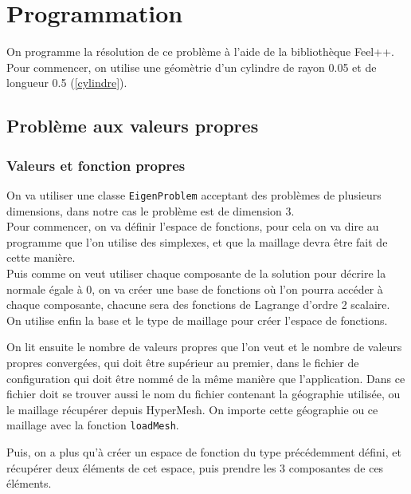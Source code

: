 \chapter{Programmation}

On programme la résolution de ce problème à l'aide de la bibliothèque Feel++. Pour commencer, on utilise une géomètrie d'un cylindre de rayon 0.05 et de longueur 0.5 (\ref{cylindre}).
\section{Problème aux valeurs propres}
\subsection{Valeurs et fonction propres}

On va utiliser une classe \texttt{EigenProblem} acceptant des problèmes de plusieurs dimensions, dans notre cas le problème est de dimension 3.\\
Pour commencer, on va définir l'espace de fonctions, pour cela on va dire au programme que l'on utilise des simplexes, et que la maillage devra être fait de cette manière.\\
Puis comme on veut utiliser chaque composante de la solution pour décrire la normale égale à 0, on va créer une base de fonctions où l'on pourra accéder à chaque composante, chacune sera des fonctions de Lagrange d'ordre 2 scalaire.\\
On utilise enfin la base et le type de maillage pour créer l'espace de fonctions.



On lit ensuite le nombre de valeurs propres que l'on veut et le nombre de valeurs propres convergées, qui doit être supérieur au premier, dans le fichier de configuration qui doit être nommé de la même manière que l'application. Dans ce fichier doit se trouver aussi le nom du fichier contenant la géographie utilisée, ou le maillage récupérer depuis HyperMesh. On importe cette géographie ou ce maillage avec la fonction \texttt{loadMesh}.



Puis, on a plus qu'à créer un espace de fonction du type précédemment défini, et récupérer deux éléments de cet espace, puis prendre les 3 composantes de ces éléments.



